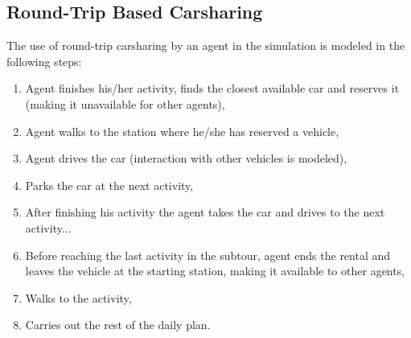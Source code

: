 \subsection{Round-Trip Based Carsharing}
The use of round-trip carsharing by an agent in the simulation is modeled in the following steps: 
\begin{enumerate}\styleEnumerate
	\item Agent finishes his/her activity, finds the closest available car and reserves it (making it unavailable for other agents),
	\item Agent walks to the station where he/she has reserved a vehicle,
	\item Agent drives the car (interaction with other vehicles is modeled),
	\item Parks the car at the next activity,
	\item After finishing his activity the agent takes the car and drives to the next activity...
	\item Before reaching the last activity in the subtour, agent ends the rental and leaves the vehicle at the starting station, making it available to other agents,
	\item Walks to the activity,
	\item Carries out the rest of the daily plan.
\end{enumerate}

